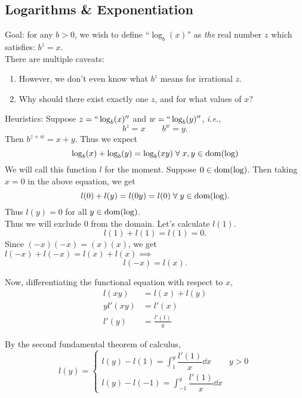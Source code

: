 
\subsection{Logarithms \& Exponentiation}
Goal: for any $b > 0$, we wish to define ``$\log_{b}(x)$'' as \emph{the} real number $z$ which satisfies: $b^z = x$. \\
There are multiple caveats:

\begin{enumerate}[label=(\alph*)]
    \item However, we don't even know what $b^{z}$ means for irrational $z$.
    \item Why should there exist exactly one $z$, and for what values of $x$?
\end{enumerate}

Heuristics: Suppose $z = ``\log_{b}(x)''$ and $w = ``\log_{b}(y)''$, \textit{i.e.}, \[
    b^{z} = x \qquad b^{w} = y.
\] Then $b^{z + w} = x + y$. Thus we expect \begin{equation}
    \log_{b}(x) + \log_{b}(y) = \log_{b}(xy) \;\forall\; x, y \in \operatorname{dom}(\log)
\end{equation}
We will call this function $l$ for the moment.
Suppose $0 \in \operatorname{dom}(\log)$. Then taking $x = 0$ in the above equation, we get \[
    l(0) + l(y) = l(0y) = l(0) \;\forall\; y \in \operatorname{dom}(\log).
\] Thus $l(y) = 0$ for all $y \in \operatorname{dom}(\log)$. \\

Thus we will exclude $0$ from the domain. Let's calculate $l(1)$. \[
    l(1) + l(1) = l(1) = 0.
\] Since $(-x)(-x) = (x)(x)$, we get $l(-x) + l(-x) = l(x) + l(x) \implies$ \[
    l(-x) = l(x).
\]

Now, differentiating the functional equation with respect to $x$,
\begin{align*}
    l(xy) &= l(x) + l(y) \\
    yl'(xy) &= l'(x) \\
    l'(y) &= \frac{l'(1)}{y}
\end{align*}

By the second fundamental theorem of calculus, \[
    l(y) = \begin{cases}
        l(y) - l(1) = \int_{1}^{y} \dfrac{l'(1)}{x} \dd x & y > 0 \\
        l(y) - l(-1) = \int_{-1}^{y} \dfrac{l'(1)}{x} \dd x
    \end{cases}
\]


